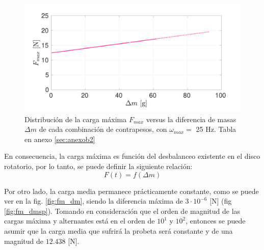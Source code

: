 \begin{figure}[h]
\centering
\includegraphics[width=\linewidth, trim={0cm 0cm 2cm 0cm},clip]{Imagenes/fmax_dm_25.pdf}
\caption{Distribución de la carga máxima $F_{max}$ versus la diferencia de masas $\Delta m$ de cada combinación de contrapesos, con $\omega_{max} =$ 25 Hz. Tabla en anexo \ref{sec:anexob2}}
\label{fig:fmax_dm25}
\end{figure}

En consecuencia, la carga máxima es función del desbalanceo existente en el disco rotatorio, por lo tanto, se puede definir la siguiente relación: 
\begin{equation}\label{eq:func_dm}
	F(t) = f(\Delta m)
\end{equation}

Por otro lado, la carga media permanece prácticamente constante, como se puede ver en la fig. \ref{fig:fm_dm}, siendo la diferencia máxima de $3\cdot10^{-6}$ [N] (fig \ref{fig:fm_dmsp}). Tomando en consideración que el orden de magnitud de las cargas máxima y alternantes está en el orden de $10^1$ y $10^2$, entonces se puede asumir que la carga media que sufrirá la probeta será constante y de una magnitud de $12.438$ [N]. 

